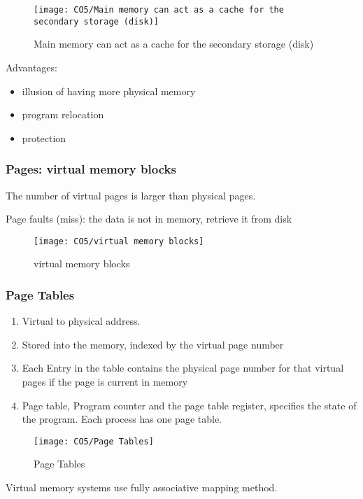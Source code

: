 \begin{figure}[!htb]
    \centering
    \texttt{[image: CO5/Main memory can act as a cache for the secondary storage (disk)]}
    \caption{Main memory can act as a cache for the secondary storage (disk)}
\end{figure}
Advantages:
\begin{itemize}\small
    \item illusion of having more physical memory
    \item program relocation
    \item protection
\end{itemize}

\subsubsection{Pages: virtual memory blocks}
The number of virtual pages is larger than physical pages. 

Page faults (miss): the data is not in memory, retrieve it from disk

\begin{figure}[!htb]
    \centering
    \texttt{[image: CO5/virtual memory blocks]}
    \caption{virtual memory blocks}
\end{figure}

\subsubsection{Page Tables}
\begin{enumerate}\small
    \item Virtual to physical address. 
    \item Stored into the memory, indexed by the virtual page number
    \item Each Entry in the table contains the physical page number for that virtual pages if the page is current in memory
    \item Page table, Program counter and the page table register, specifies the state of the program. Each process has one page table.
\end{enumerate}

\begin{figure}[!htb]
    \centering
    \texttt{[image: CO5/Page Tables]}
    \caption{Page Tables}
\end{figure}

Virtual memory systems use fully associative mapping method. 

